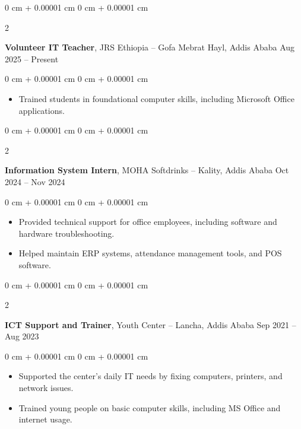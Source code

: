 \documentclass[10pt, letterpaper]{article}
\newenvironment{highlights}{
    \begin{itemize}[
        topsep=0.10 cm,
        parsep=0.10 cm,
        partopsep=0pt,
        itemsep=0pt,
        leftmargin=0 cm + 10pt
    ]
}{
    \end{itemize}
} %
\newenvironment{onecolentry}{
    \begin{adjustwidth}{
        0 cm + 0.00001 cm
    }{
        0 cm + 0.00001 cm
    }
}{
    \end{adjustwidth}
} %
\newenvironment{twocolentry}[2][]{
    \onecolentry
    \def\secondColumn{#2}
    \setcolumnwidth{\fill, 4.5 cm}
    \begin{paracol}{2}
}{
    \switchcolumn \raggedleft \secondColumn
    \end{paracol}
    \endonecolentry
} %
\begin{document}
        \vspace{0.2 cm}
            \begin{twocolentry}{
            Aug 2025 – Present
        }
            \textbf{Volunteer IT Teacher}, JRS Ethiopia -- Gofa Mebrat Hayl, Addis Ababa\end{twocolentry}

        \vspace{0.10 cm}
        \begin{onecolentry}
            \begin{highlights}
                \item Trained students in foundational computer skills, including Microsoft Office applications.
            \end{highlights}
        \end{onecolentry}


        \vspace{0.2 cm}
        
        \begin{twocolentry}{
            Oct 2024 – Nov 2024
        }
            \textbf{Information System Intern}, MOHA Softdrinks -- Kality, Addis Ababa\end{twocolentry}

        \vspace{0.10 cm}
        \begin{onecolentry}
            \begin{highlights}
                \item Provided technical support for office employees, including software and hardware troubleshooting.
                \item Helped maintain ERP systems, attendance management tools, and POS software.
            \end{highlights}
        \end{onecolentry}


        \vspace{0.2 cm}

        \begin{twocolentry}{
            Sep 2021 – Aug 2023
        }
            \textbf{ICT Support and Trainer}, Youth Center -- Lancha, Addis Ababa\end{twocolentry}

        \vspace{0.10 cm}
        \begin{onecolentry}
            \begin{highlights}
                \item Supported the center’s daily IT needs by fixing computers, printers, and network issues.
                \item Trained young people on basic computer skills, including MS Office and internet usage.
            \end{highlights}
        \end{onecolentry}
\end{document}

